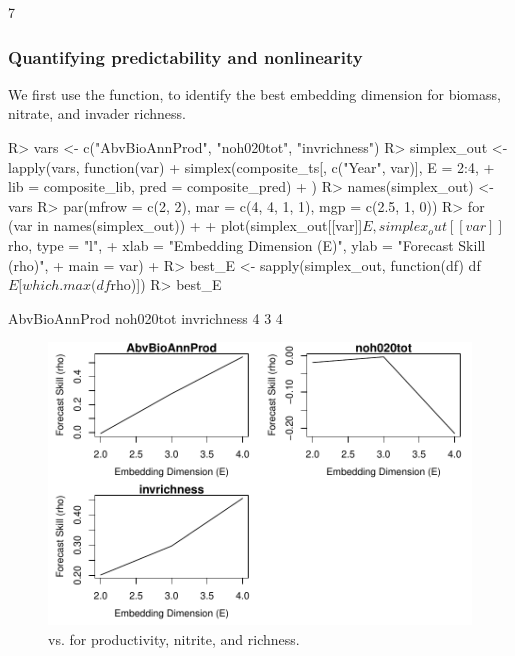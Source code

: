 \documentclass[article]{jss}
\begin{document}
\begin{Schunk}
\begin{Soutput}
[1] 7
\end{Soutput}
\end{Schunk}

\subsubsection{Quantifying predictability and nonlinearity}\label{sec:e120-predictability-nonlinearity}

We first use the  function,  to identify the best embedding dimension for biomass, nitrate, and invader richness.

\begin{Schunk}
\begin{Sinput}
R> vars <- c("AbvBioAnnProd", "noh020tot", "invrichness")
R> simplex_out <- lapply(vars, function(var) {
+      simplex(composite_ts[, c("Year", var)], E = 2:4, 
+              lib = composite_lib, pred = composite_pred)
+  })
R> names(simplex_out) <- vars
R> par(mfrow = c(2, 2), mar = c(4, 4, 1, 1), mgp = c(2.5, 1, 0))
R> for (var in names(simplex_out))
+  {
+      plot(simplex_out[[var]]$E, simplex_out[[var]]$rho, type = "l", 
+           xlab = "Embedding Dimension (E)", ylab = "Forecast Skill (rho)", 
+           main = var)
+  }
R> best_E <- sapply(simplex_out, function(df) {df$E[which.max(df$rho)]})
R> best_E
\end{Sinput}
\begin{Soutput}
AbvBioAnnProd     noh020tot   invrichness 
            4             3             4 
\end{Soutput}
\end{Schunk}

\begin{figure}[t!]
\begin{center}
\includegraphics[width=6in]{article-simplex-e120}
\end{center}
\caption{\label{fig:simplex-e120}  vs.  for productivity, nitrite, and richness.}
\end{figure}
\end{document}
